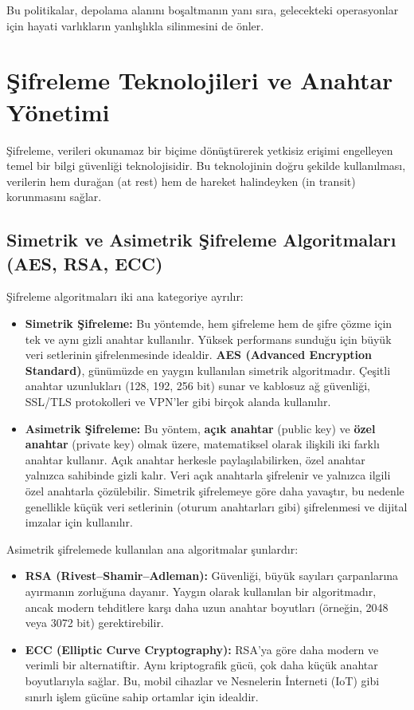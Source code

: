 Bu politikalar, depolama alanını boşaltmanın yanı sıra, gelecekteki operasyonlar için hayati varlıkların yanlışlıkla silinmesini de önler.

\section{Şifreleme Teknolojileri ve Anahtar Yönetimi}

Şifreleme, verileri okunamaz bir biçime dönüştürerek yetkisiz erişimi engelleyen temel bir bilgi güvenliği teknolojisidir. Bu teknolojinin doğru şekilde kullanılması, verilerin hem durağan (at rest) hem de hareket halindeyken (in transit) korunmasını sağlar.

\subsection{Simetrik ve Asimetrik Şifreleme Algoritmaları (AES, RSA, ECC)}

Şifreleme algoritmaları iki ana kategoriye ayrılır:

\begin{itemize}
    \item \textbf{Simetrik Şifreleme:} Bu yöntemde, hem şifreleme hem de şifre çözme için tek ve aynı gizli anahtar kullanılır. Yüksek performans sunduğu için büyük veri setlerinin şifrelenmesinde idealdir. \textbf{AES (Advanced Encryption Standard)}, günümüzde en yaygın kullanılan simetrik algoritmadır. Çeşitli anahtar uzunlukları (128, 192, 256 bit) sunar ve kablosuz ağ güvenliği, SSL/TLS protokolleri ve VPN'ler gibi birçok alanda kullanılır.
    \item \textbf{Asimetrik Şifreleme:} Bu yöntem, \textbf{açık anahtar} (public key) ve \textbf{özel anahtar} (private key) olmak üzere, matematiksel olarak ilişkili iki farklı anahtar kullanır. Açık anahtar herkesle paylaşılabilirken, özel anahtar yalnızca sahibinde gizli kalır. Veri açık anahtarla şifrelenir ve yalnızca ilgili özel anahtarla çözülebilir. Simetrik şifrelemeye göre daha yavaştır, bu nedenle genellikle küçük veri setlerinin (oturum anahtarları gibi) şifrelenmesi ve dijital imzalar için kullanılır.
\end{itemize}

Asimetrik şifrelemede kullanılan ana algoritmalar şunlardır:

\begin{itemize}
    \item \textbf{RSA (Rivest–Shamir–Adleman):} Güvenliği, büyük sayıları çarpanlarına ayırmanın zorluğuna dayanır. Yaygın olarak kullanılan bir algoritmadır, ancak modern tehditlere karşı daha uzun anahtar boyutları (örneğin, 2048 veya 3072 bit) gerektirebilir.
    \item \textbf{ECC (Elliptic Curve Cryptography):} RSA'ya göre daha modern ve verimli bir alternatiftir. Aynı kriptografik gücü, çok daha küçük anahtar boyutlarıyla sağlar. Bu, mobil cihazlar ve Nesnelerin İnterneti (IoT) gibi sınırlı işlem gücüne sahip ortamlar için idealdir.
\end{itemize}

